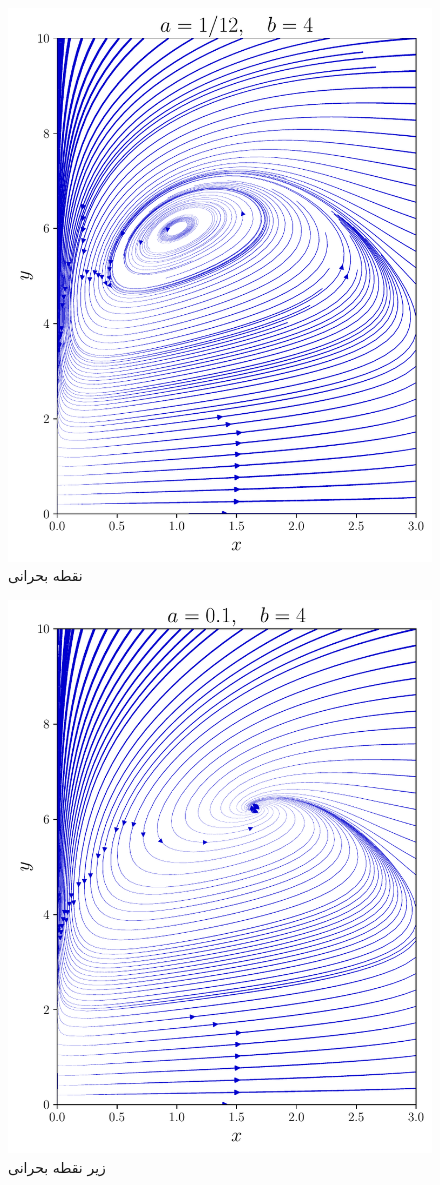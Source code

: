 \documentclass[12pt,a4paper]{article}
\begin{document}
	\begin{figure}[h!]
		\centering
		\includegraphics[width=\linewidth]{fig/8.2.9.critical}
		\caption{نقطه بحرانی}
	\end{figure}
	\begin{figure}[h!]
		\centering
		\includegraphics[width=\linewidth]{fig/8.2.9.undercrit}
		\caption{زیر نقطه بحرانی}
	\end{figure}
\end{document}
